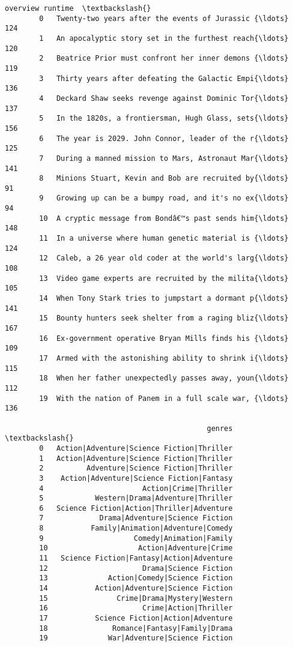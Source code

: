 \documentclass[11pt]{article}
\begin{document}
\begin{Verbatim}[commandchars=\\\{\}]
                                                     overview runtime  \textbackslash{}
        0   Twenty-two years after the events of Jurassic {\ldots}     124   
        1   An apocalyptic story set in the furthest reach{\ldots}     120   
        2   Beatrice Prior must confront her inner demons {\ldots}     119   
        3   Thirty years after defeating the Galactic Empi{\ldots}     136   
        4   Deckard Shaw seeks revenge against Dominic Tor{\ldots}     137   
        5   In the 1820s, a frontiersman, Hugh Glass, sets{\ldots}     156   
        6   The year is 2029. John Connor, leader of the r{\ldots}     125   
        7   During a manned mission to Mars, Astronaut Mar{\ldots}     141   
        8   Minions Stuart, Kevin and Bob are recruited by{\ldots}      91   
        9   Growing up can be a bumpy road, and it's no ex{\ldots}      94   
        10  A cryptic message from Bondâ€™s past sends him{\ldots}     148   
        11  In a universe where human genetic material is {\ldots}     124   
        12  Caleb, a 26 year old coder at the world's larg{\ldots}     108   
        13  Video game experts are recruited by the milita{\ldots}     105   
        14  When Tony Stark tries to jumpstart a dormant p{\ldots}     141   
        15  Bounty hunters seek shelter from a raging bliz{\ldots}     167   
        16  Ex-government operative Bryan Mills finds his {\ldots}     109   
        17  Armed with the astonishing ability to shrink i{\ldots}     115   
        18  When her father unexpectedly passes away, youn{\ldots}     112   
        19  With the nation of Panem in a full scale war, {\ldots}     136   
        
                                               genres  \textbackslash{}
        0   Action|Adventure|Science Fiction|Thriller   
        1   Action|Adventure|Science Fiction|Thriller   
        2          Adventure|Science Fiction|Thriller   
        3    Action|Adventure|Science Fiction|Fantasy   
        4                       Action|Crime|Thriller   
        5            Western|Drama|Adventure|Thriller   
        6   Science Fiction|Action|Thriller|Adventure   
        7             Drama|Adventure|Science Fiction   
        8           Family|Animation|Adventure|Comedy   
        9                     Comedy|Animation|Family   
        10                     Action|Adventure|Crime   
        11   Science Fiction|Fantasy|Action|Adventure   
        12                      Drama|Science Fiction   
        13              Action|Comedy|Science Fiction   
        14           Action|Adventure|Science Fiction   
        15                Crime|Drama|Mystery|Western   
        16                      Crime|Action|Thriller   
        17           Science Fiction|Action|Adventure   
        18               Romance|Fantasy|Family|Drama   
        19              War|Adventure|Science Fiction   
        

\end{Verbatim}
\end{document}
